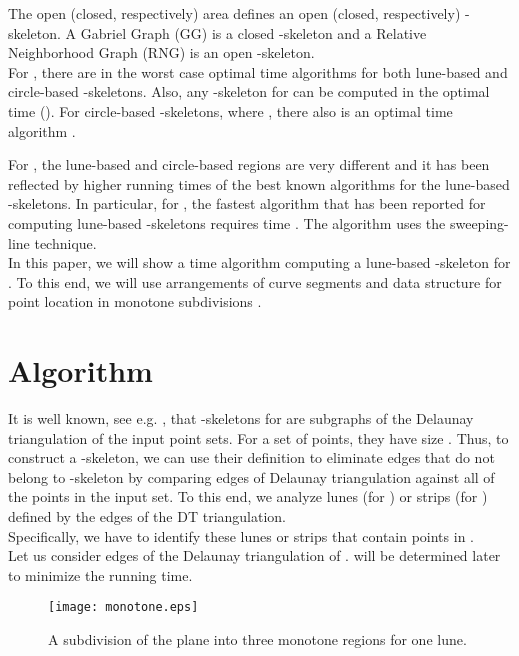 \documentclass[10pt]{article}
\begin{document}
The open (closed, respectively) area  defines an open (closed, respectively) -skeleton. 
A Gabriel Graph (GG) \cite{gs69} is a closed -skeleton and a Relative Neighborhood Graph (RNG) 
\cite{t80}  is an open -skeleton. \\




For , there are in the worst case optimal  time algorithms \cite{hlm03} 
for both lune-based and circle-based 
-skeletons.  Also, any -skeleton for  
can be computed in the optimal  time (\cite{jky89,l94,ms80,s83}). 
For circle-based 
-skeletons, where , there also is an optimal  time 
algorithm \cite{kr85}. 

For , the lune-based and circle-based regions  are
very different and it has been reflected by higher running times
of the best known algorithms for the lune-based -skeletons.
In particular, for , the fastest algorithm that 
has been reported for computing 
lune-based -skeletons requires  time \cite{rm97}.
The algorithm uses  the sweeping-line technique. \\
In this paper, we will show a  
time algorithm computing a lune-based 
-skeleton for  . To this end, we will use 
arrangements of curve segments \cite{agr00} and data structure for point location
in monotone subdivisions \cite{egs86}. 

\section{Algorithm}

It is well known, see e.g. \cite{kr85}, that -skeletons for  are subgraphs 
of the Delaunay triangulation of the input point sets. For a set  of  points,  they have size . 
Thus, to construct a -skeleton, we can use their definition to eliminate edges that do not belong 
to -skeleton by comparing edges of Delaunay triangulation against all of the points in the input set. 
To this end, we analyze lunes (for ) 
or strips (for ) defined by the edges of the DT triangulation. \\
Specifically, we have to identify these lunes or strips that contain points
in . \\
Let us consider  edges of the Delaunay triangulation of . 
 will be determined later to minimize the running time. \\


\begin{figure}[hbt]
\begin{center}
\texttt{[image: monotone.eps]}
\caption{ A subdivision of the plane into three monotone regions for one lune. }
\label{fig:2}
\end{center}
\end{figure}
\end{document}
